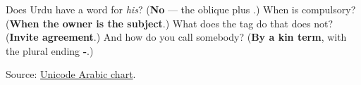 \begin{tcolorbox}[breakable,colback=teal!4,colframe=teal!35!black,title={Before you move on}]
Does Urdu have a word for \emph{his}? (\textbf{No} — the oblique plus \textbf{}.) When is \textbf{} compulsory? (\textbf{When the owner is the subject}.) What does the tag do that \textbf{} does not? (\textbf{Invite agreement}.) And how do you call somebody? (\textbf{By a kin term}, with the plural ending \textbf{-}.)

Source: \href{https://www.unicode.org/charts/PDF/U0600.pdf}{Unicode Arabic chart}.
\end{tcolorbox}
